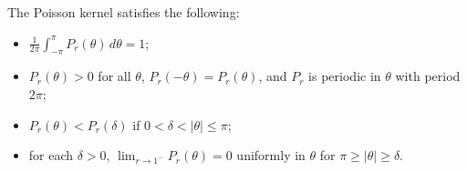 The Poisson kernel satisfies the following:
\begin{itemize}
\item[(a)] $\displaystyle \frac{1}{2\pi} \int_{-\pi}^{\pi} P_r(\theta) \, d\theta = 1$;
\item[(b)] $P_r(\theta) > 0$ for all $\theta$, $P_r(-\theta) = P_r(\theta)$, and $P_r$ is periodic in $\theta$ with period $2\pi$;
\item[(c)] $P_r(\theta) < P_r(\delta)$ if $0 < \delta < |\theta| \leq \pi$;
\item[(d)] for each $\delta > 0$, $\displaystyle \lim_{r \to 1^-} P_r(\theta) = 0$ uniformly in $\theta$ for $\pi \geq |\theta| \geq \delta$.
\end{itemize}
